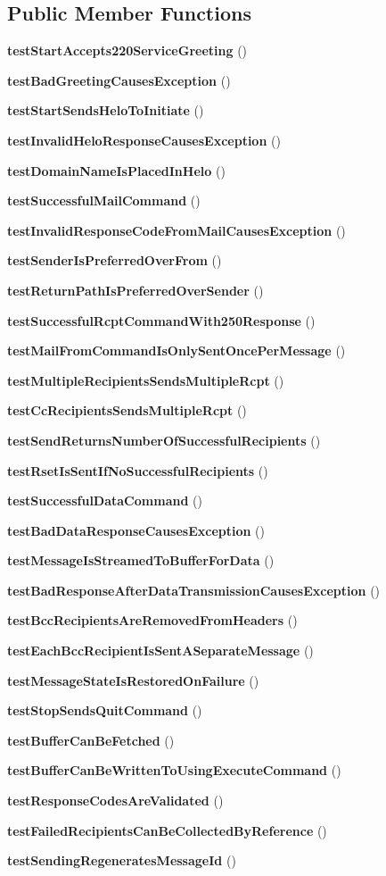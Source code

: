 \subsection*{Public Member Functions}
\begin{DoxyCompactItemize}
\item 
{\bf test\+Start\+Accepts220\+Service\+Greeting} ()
\item 
{\bf test\+Bad\+Greeting\+Causes\+Exception} ()
\item 
{\bf test\+Start\+Sends\+Helo\+To\+Initiate} ()
\item 
{\bf test\+Invalid\+Helo\+Response\+Causes\+Exception} ()
\item 
{\bf test\+Domain\+Name\+Is\+Placed\+In\+Helo} ()
\item 
{\bf test\+Successful\+Mail\+Command} ()
\item 
{\bf test\+Invalid\+Response\+Code\+From\+Mail\+Causes\+Exception} ()
\item 
{\bf test\+Sender\+Is\+Preferred\+Over\+From} ()
\item 
{\bf test\+Return\+Path\+Is\+Preferred\+Over\+Sender} ()
\item 
{\bf test\+Successful\+Rcpt\+Command\+With250\+Response} ()
\item 
{\bf test\+Mail\+From\+Command\+Is\+Only\+Sent\+Once\+Per\+Message} ()
\item 
{\bf test\+Multiple\+Recipients\+Sends\+Multiple\+Rcpt} ()
\item 
{\bf test\+Cc\+Recipients\+Sends\+Multiple\+Rcpt} ()
\item 
{\bf test\+Send\+Returns\+Number\+Of\+Successful\+Recipients} ()
\item 
{\bf test\+Rset\+Is\+Sent\+If\+No\+Successful\+Recipients} ()
\item 
{\bf test\+Successful\+Data\+Command} ()
\item 
{\bf test\+Bad\+Data\+Response\+Causes\+Exception} ()
\item 
{\bf test\+Message\+Is\+Streamed\+To\+Buffer\+For\+Data} ()
\item 
{\bf test\+Bad\+Response\+After\+Data\+Transmission\+Causes\+Exception} ()
\item 
{\bf test\+Bcc\+Recipients\+Are\+Removed\+From\+Headers} ()
\item 
{\bf test\+Each\+Bcc\+Recipient\+Is\+Sent\+A\+Separate\+Message} ()
\item 
{\bf test\+Message\+State\+Is\+Restored\+On\+Failure} ()
\item 
{\bf test\+Stop\+Sends\+Quit\+Command} ()
\item 
{\bf test\+Buffer\+Can\+Be\+Fetched} ()
\item 
{\bf test\+Buffer\+Can\+Be\+Written\+To\+Using\+Execute\+Command} ()
\item 
{\bf test\+Response\+Codes\+Are\+Validated} ()
\item 
{\bf test\+Failed\+Recipients\+Can\+Be\+Collected\+By\+Reference} ()
\item 
{\bf test\+Sending\+Regenerates\+Message\+Id} ()
\end{DoxyCompactItemize}
